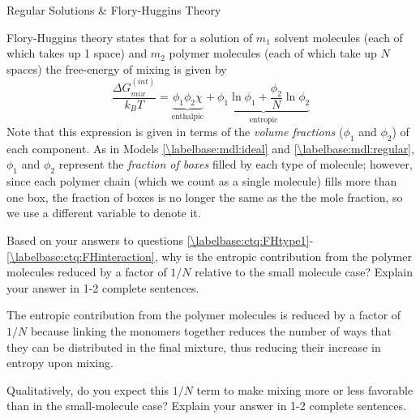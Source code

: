 \begin{activity}{Regular Solutions \& Flory-Huggins Theory}
\begin{ctqs}
\begin{enumerate}
		\end{enumerate}
	
\end{ctqs}

\begin{infobox}
	Flory-Huggins theory states that for a solution of $m_1$ solvent molecules (each of which takes up 1 space) and $m_2$ polymer molecules (each of which take up $N$ spaces) the free-energy of mixing is given by
	\begin{equation*}
		\frac{\Delta G_{mix}^{(int)}}{k_B T} = \underbrace{\phi_1 \phi_2 \chi}_{\text{enthalpic}} + \underbrace{\phi_1 \ln \phi_1 + \frac{\phi_2}{N} \ln \phi_2}_{\text{entropic}}
	\end{equation*}
	Note that this expression is given in terms of the \emph{volume fractions} ($\phi_1$ and $\phi_2$) of each component.  As in Models \ref{\labelbase:mdl:ideal} and \ref{\labelbase:mdl:regular}, $\phi_1$ and $\phi_2$ represent the \emph{fraction of boxes} filled by each type of molecule; however, since each polymer chain (which we count as a single molecule) fills more than one box, the fraction of boxes is no longer the same as the the mole fraction, so we use a different variable to denote it.
	
\end{infobox}

\begin{ctqs}

		\question Based on your answers to questions \ref{\labelbase:ctq:FHtype1}-\ref{\labelbase:ctq:FHinteraction}, why is the entropic contribution from the polymer molecules reduced by a factor of $1/N$ relative to the small molecule case? Explain your answer in 1-2 complete sentences.
		
			\begin{solution}[1.75in]
			
				The entropic contribution from the polymer molecules is reduced by a factor of $1/N$ because linking the monomers together reduces the number of ways that they can be distributed in the final mixture, thus reducing their increase in entropy upon mixing.
			
			\end{solution}
		
		\question Qualitatively, do you expect this $1/N$ term to make mixing more or less favorable than in the small-molecule case?  Explain your answer in 1-2 complete sentences.
		
			\begin{solution}[2in]
			

\end{solution}
\end{ctqs}
\end{activity}
